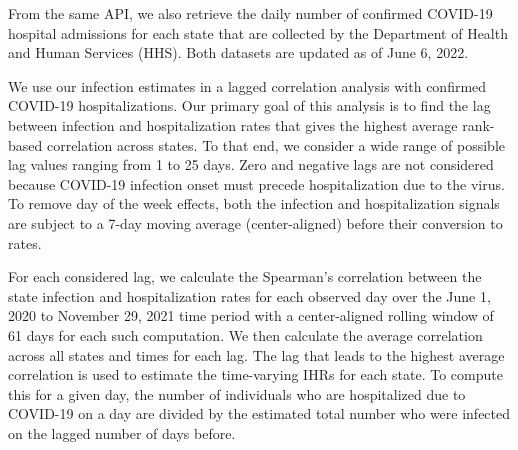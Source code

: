 From the same API, we also retrieve the daily number of confirmed COVID-19
hospital admissions for each state that are collected by the \US Department of
Health and Human Services (HHS). Both datasets are updated as of June 6, 2022.

We use our infection estimates in a lagged correlation analysis with confirmed
COVID-19 hospitalizations. Our primary goal of this analysis is to find the lag
between infection and hospitalization rates that gives the highest average
rank-based correlation across \US states. To that end, we consider a wide range
of possible lag values ranging from 1 to 25 days. Zero and negative lags are not
considered because COVID-19 infection onset must precede hospitalization due to
the virus. To remove day of the week effects, both the infection and
hospitalization signals are subject to a 7-day moving average (center-aligned)
before their conversion to rates.

For each considered lag, we calculate the Spearman's correlation between the 
state infection and hospitalization rates for each observed day 
over the June 1, 2020 to November 29, 2021
time period %
with a center-aligned rolling window of 61 days for each such computation.
We then calculate the average correlation across all states and times for each lag. 
The lag that leads to the highest average correlation is used to estimate 
the time-varying IHRs for each
state. To compute this for a given day, the number of individuals who are
hospitalized due to COVID-19 on a day are divided by the estimated total number
who were infected on the lagged number of days before.
